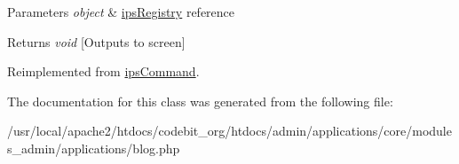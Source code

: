 \begin{DoxyParams}{Parameters}
{\em object} & \hyperlink{classips_registry}{ips\-Registry} reference \\
\hline
\end{DoxyParams}
\begin{DoxyReturn}{Returns}
{\itshape void} \mbox{[}Outputs to screen\mbox{]} 
\end{DoxyReturn}


Reimplemented from \hyperlink{classips_command_afbc4e912a0604b94d47d66744c64d8ba}{ips\-Command}.



The documentation for this class was generated from the following file\-:\begin{DoxyCompactItemize}
\item 
/usr/local/apache2/htdocs/codebit\-\_\-org/htdocs/admin/applications/core/modules\-\_\-admin/applications/blog.\-php\end{DoxyCompactItemize}
